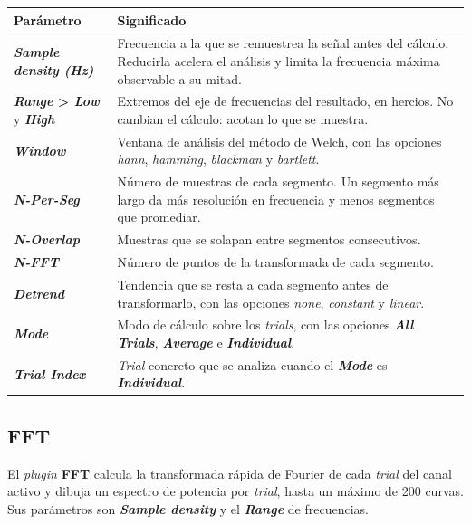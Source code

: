 \documentclass[11pt,a4paper]{article}
\begin{document}
    \begin{center}
    \small
    \begin{tabularx}{\textwidth}{|p{}|X|}
    \hline
    \textbf{Par\'ametro} & \textbf{Significado} \\
    \hline
    \textbf{\textit{Sample density (Hz)}} & Frecuencia a la que se remuestrea la se\~nal antes del c\'alculo. Reducirla acelera el an\'alisis y limita la frecuencia m\'axima observable a su mitad. \\
    \hline
    \textbf{\textit{Range} > \textit{Low}} y \textbf{\textit{High}} & Extremos del eje de frecuencias del resultado, en hercios. No cambian el c\'alculo: acotan lo que se muestra. \\
    \hline
    \textbf{\textit{Window}} & Ventana de an\'alisis del m\'etodo de Welch, con las opciones \textit{hann}, \textit{hamming}, \textit{blackman} y \textit{bartlett}. \\
    \hline
    \textbf{\textit{N-Per-Seg}} & N\'umero de muestras de cada segmento. Un segmento m\'as largo da m\'as resoluci\'on en frecuencia y menos segmentos que promediar. \\
    \hline
    \textbf{\textit{N-Overlap}} & Muestras que se solapan entre segmentos consecutivos. \\
    \hline
    \textbf{\textit{N-FFT}} & N\'umero de puntos de la transformada de cada segmento. \\
    \hline
    \textbf{\textit{Detrend}} & Tendencia que se resta a cada segmento antes de transformarlo, con las opciones \textit{none}, \textit{constant} y \textit{linear}. \\
    \hline
    \textbf{\textit{Mode}} & Modo de c\'alculo sobre los \textit{trials}, con las opciones \textbf{\textit{All Trials}}, \textbf{\textit{Average}} e \textbf{\textit{Individual}}. \\
    \hline
    \textbf{\textit{Trial Index}} & \textit{Trial} concreto que se analiza cuando el \textbf{\textit{Mode}} es \textbf{\textit{Individual}}. \\
    \hline
    \end{tabularx}
    \label{tab:mu_parametros_frecuencia}
    \end{center}

    \subsection{FFT}
    El \textit{plugin} \textbf{FFT} calcula la transformada r\'apida de Fourier de cada \textit{trial} del canal activo y dibuja un espectro de potencia por \textit{trial}, hasta un m\'aximo de 200 curvas. Sus par\'ametros son \textbf{\textit{Sample density}} y el \textbf{\textit{Range}} de frecuencias.
\end{document}
